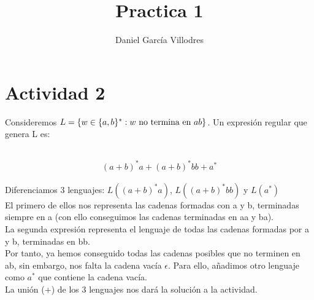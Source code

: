 \documentclass[fleqn, 10pt]{article}
\title{\textbf{Practica 1}}
\author{Daniel García Villodres}
\date{}
\begin{document}
\maketitle
\thispagestyle{empty}

\section*{Actividad 2}
Consideremos $L=\{w\in \{a,b\}^* : w \textnormal{ no termina en } ab\}$. Un expresión regular que genera L es: \\

\subsection*{}

\begin{ceqn}
	\begin{align*}
	(a+b)^*a+(a+b)^*bb+a^*
	\end{align*}
\end{ceqn}
Diferenciamos 3 lenguajes: $L((a+b)^*a)$, $L((a+b)^*bb)$ y $L(a^*)$\\
El primero de ellos nos representa las cadenas formadas con a y b, terminadas siempre en a (con ello conseguimos las cadenas terminadas en aa y ba).\\
La segunda expresión representa el lenguaje de todas las cadenas formadas por a y b, terminadas en bb.\\
Por tanto, ya hemos conseguido todas las cadenas posibles que no terminen en ab, sin embargo, nos falta la cadena vacía $\epsilon$. Para ello, añadimos otro lenguaje como $a^*$ que contiene la cadena vacía.\\
La unión (+) de los 3 lenguajes nos dará la solución a la actividad.\\
\end{document}
